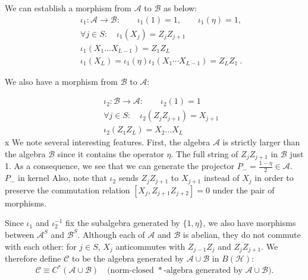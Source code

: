 \documentclass{article}
\newcommand{\mA}{\mathcal{A}}
\newcommand{\mB}{\mathcal{B}}
\newcommand{\mC}{\mathcal{C}}
\theoremstyle{definition}
\begin{document}

  We can establish a morphism from $\mA$ to $\mB$ as below:
  \begin{eqnarray}
    &&\iota_1:\mA\to \mathcal{B}:\qquad \iota_1(1)=1,\qquad \iota_1(\eta)= 1,\\
    &&\forall j\in S:\quad\iota_1(X_j)=Z_jZ_{j+1}\\
    &&\iota_1(X_1...X_{L-1})=Z_1Z_{L}\\
    &&\iota_1(X_L)=\iota_1(\eta)\iota_1(X_1\cdots X_{L-1})=Z_LZ_1\ .
  \end{eqnarray}

  We also have a morphism from $\mB$ to $\mA$:

  \begin{eqnarray}
    &&\iota_2:\mB\to \mA:\qquad \iota_2(1)=1\\
    &&\forall j\in S:\quad\iota_2(Z_jZ_{j+1})= X_{j+1}\\
    &&\iota_2(Z_1Z_{L})= X_{2}...X_{L}
  \end{eqnarray}
  x We note several interesting features. First, the algebra $\mA$ is strictly
  larger than the algebra $\mB$ since it contains the operator $\eta$. The full string
  of $Z_{j}Z_{j+1}$ in $\mB$ just 1. As a consequence, we see that we can
  generate the projector $P_{-}= \frac{1-\eta}{2}\in \mA$.
  \color{brown}
  $P_{-}$ in kernel
  \color{black}
  Also, note that $\iota_{2}$ sends $Z_{j}Z_{j+1}$ to $X_{j+1}$ instead of
  $X_{j}$ in order to preserve the commutation relation
  $[X_{j},Z_{j+1}Z_{j+2}] = 0$ under the pair of morphisms.


  Since $\iota_{1}$ and $\iota^{-1}_{2}$ fix the subalgebra generated by $\{1,\eta
  \}$, we also have morphisms between $\mA^{S}$ and $\mB^{S}$. Although each of $\mA$
  and $\mB$ is abelian, they do not commute with each other: for $j\in S$,
  $X_{j}$ anticommutes with $Z_{j-1}Z_{j}$ and $Z_{j}Z_{j+1}$. We therefore define
  $\mC$ to be the algebra generated by $\mA\cup\mB$ in $B(\mathcal{H})$:
  \[
    \mC \equiv C^{*}(\mA\cup\mB) \quad\text{(norm-closed $*$-algebra generated by
    $\mA\cup\mB$).}
  \]
\end{document}
